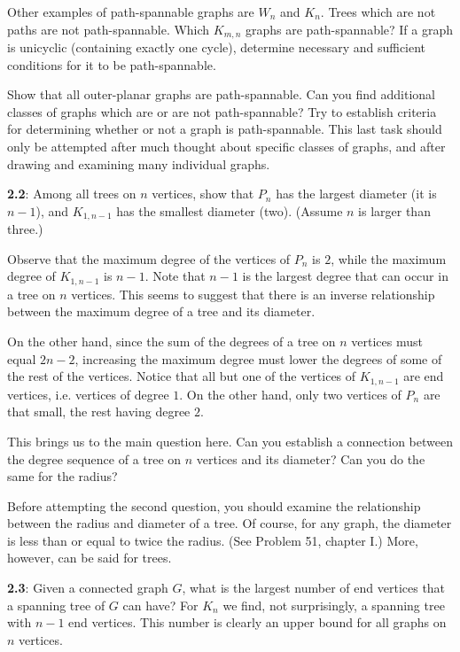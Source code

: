 \documentclass{article}
\begin{document}
Other examples of path-spannable graphs are $W_n$ and $K_n$. Trees which are not paths are not path-spannable. Which $K_{m,n}$ graphs are path-spannable? If a graph is unicyclic (containing exactly one cycle), determine necessary and sufficient conditions for it to be path-spannable.

Show that all outer-planar graphs are path-spannable. Can you find additional classes of graphs which are or are not path-spannable? Try to establish criteria for determining whether or not a graph is path-spannable. This last task should only be attempted after much thought about specific classes of graphs, and after drawing and examining many individual graphs.

\vspace{0.5cm}

\textbf{2.2}: Among all trees on $n$ vertices, show that $P_n$ has the largest diameter (it is $n-1$), and $K_{1,n-1}$ has the smallest diameter (two). (Assume $n$ is larger than three.)

Observe that the maximum degree of the vertices of $P_n$ is $2$, while the maximum degree of $K_{1,n-1}$ is $n-1$. Note that $n-1$ is the largest degree that can occur in a tree on $n$ vertices. This seems to suggest that there is an inverse relationship between the maximum degree of a tree and its diameter.

On the other hand, since the sum of the degrees of a tree on $n$ vertices must equal $2n-2$, increasing the maximum degree must lower the degrees of some of the rest of the vertices. Notice that all but one of the vertices of $K_{1,n-1}$ are end vertices, i.e. vertices of degree $1$. On the other hand, only two vertices of $P_n$ are that small, the rest having degree $2$.

This brings us to the main question here. Can you establish a connection between the degree sequence of a tree on $n$ vertices and its diameter? Can you do the same for the radius?

Before attempting the second question, you should examine the relationship between the radius and diameter of a tree. Of course, for any graph, the diameter is less than or equal to twice the radius. (See Problem 51, chapter I.) More, however, can be said for trees.

\vspace{0.5cm}

\textbf{2.3}: Given a connected graph $G$, what is the largest number of end vertices that a spanning tree of $G$ can have? For $K_n$ we find, not surprisingly, a spanning tree with $n-1$ end vertices. This number is clearly an upper bound for all graphs on $n$ vertices.
\end{document}
